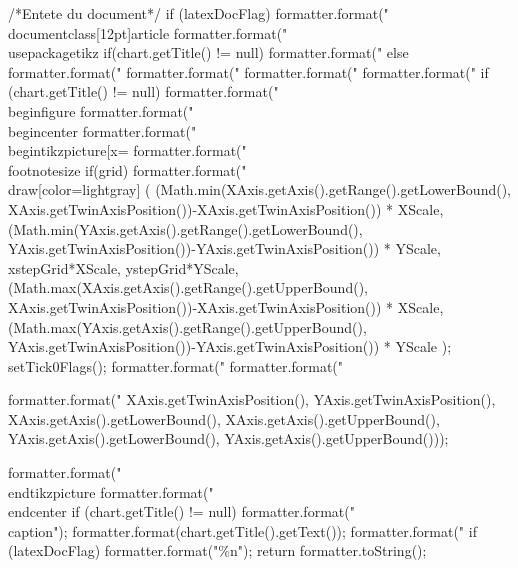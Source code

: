 \begin{code}
\begin{hide}
{      /*Entete du document*/
      if (latexDocFlag) {
         formatter.format("\\documentclass[12pt]{article}%
         formatter.format("\\usepackage{tikz}%
      }
      if(chart.getTitle() != null)
         formatter.format("%
      else
         formatter.format("%
      formatter.format("%
      formatter.format("%
      formatter.format("%
      if (chart.getTitle() != null)
         formatter.format("\\begin{figure}%
      formatter.format("\\begin{center}%
      formatter.format("\\begin{tikzpicture}[x=%
      formatter.format("\\footnotesize%
      if(grid)
         formatter.format("\\draw[color=lightgray] (%
            (Math.min(XAxis.getAxis().getRange().getLowerBound(),
              XAxis.getTwinAxisPosition())-XAxis.getTwinAxisPosition()) * XScale,
            (Math.min(YAxis.getAxis().getRange().getLowerBound(),
             YAxis.getTwinAxisPosition())-YAxis.getTwinAxisPosition()) * YScale,
            xstepGrid*XScale, ystepGrid*YScale,
            (Math.max(XAxis.getAxis().getRange().getUpperBound(),
              XAxis.getTwinAxisPosition())-XAxis.getTwinAxisPosition()) * XScale,
            (Math.max(YAxis.getAxis().getRange().getUpperBound(),
              YAxis.getTwinAxisPosition())-YAxis.getTwinAxisPosition()) * YScale );
      setTick0Flags();
      formatter.format("%
      formatter.format("%

      formatter.format("%
            XAxis.getTwinAxisPosition(), YAxis.getTwinAxisPosition(),
            XAxis.getAxis().getLowerBound(), XAxis.getAxis().getUpperBound(),
            YAxis.getAxis().getLowerBound(), YAxis.getAxis().getUpperBound()));

      formatter.format("\\end{tikzpicture}%
      formatter.format("\\end{center}%
      if (chart.getTitle() != null) {
         formatter.format("\\caption{");
         formatter.format(chart.getTitle().getText());
         formatter.format("}%
      }
      if (latexDocFlag)
         formatter.format("\%n");
      return formatter.toString();
   }\end{hide}
\end{code}
\begin{code}
\begin{hide}
}\end{hide}
\end{code}
